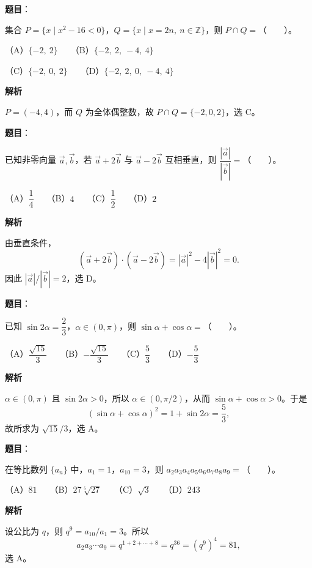 \begin{answer}

\textbf{题目}：

集合 $P=\{x\mid x^2-16<0\}$，$Q=\{x\mid x=2n,\ n\in\mathbb Z\}$，则 $P\cap Q=$\mbox{（　　）}。

（A）$\{-2,\ 2\}$　　（B）$\{-2,\ 2,\ -4,\ 4\}$

（C）$\{-2,\ 0,\ 2\}$　　（D）$\{-2,\ 2,\ 0,\ -4,\ 4\}$

\textbf{解析}

$P=(-4,4)$，而 $Q$ 为全体偶整数，故 $P\cap Q=\{-2,0,2\}$，选 C。


\end{answer}
\begin{answer}

\textbf{题目}：

已知非零向量 $\vec a,\vec b$，若 $\vec a+2\vec b$ 与 $\vec a-2\vec b$ 互相垂直，则 $\dfrac{|\vec a|}{|\vec b|}=$\mbox{（　　）}。

（A）$\dfrac14$　　（B）$4$　　（C）$\dfrac12$　　（D）$2$

\textbf{解析}

由垂直条件，
\nopagebreak[4]
\[
(\vec a+2\vec b)\cdot(\vec a-2\vec b)=|\vec a|^2-4|\vec b|^2=0.
\]
因此 $|\vec a|/|\vec b|=2$，选 D。


\end{answer}
\begin{answer}

\textbf{题目}：

已知 $\sin 2\alpha=\dfrac23$，$\alpha\in(0,\pi)$，则 $\sin\alpha+\cos\alpha=$\mbox{（　　）}。

（A）$\dfrac{\sqrt{15}}3$　　（B）$-\dfrac{\sqrt{15}}3$　　（C）$\dfrac53$　　（D）$-\dfrac53$

\textbf{解析}

$\alpha\in(0,\pi)$ 且 $\sin2\alpha>0$，所以 $\alpha\in(0,\pi/2)$，从而 $\sin\alpha+\cos\alpha>0$。于是
\nopagebreak[4]
\[
(\sin\alpha+\cos\alpha)^2=1+\sin2\alpha=\frac53,
\]
故所求为 $\sqrt{15}/3$，选 A。


\end{answer}
\begin{answer}

\textbf{题目}：

在等比数列 $\{a_n\}$ 中，$a_1=1$，$a_{10}=3$，则 $a_2a_3a_4a_5a_6a_7a_8a_9=$\mbox{（　　）}。

（A）$81$　　（B）$27\sqrt[5]{27}$　　（C）$\sqrt3$　　（D）$243$

\textbf{解析}

设公比为 $q$，则 $q^9=a_{10}/a_1=3$。所以
\nopagebreak[4]
\[
a_2a_3\cdots a_9=q^{1+2+\cdots+8}=q^{36}=(q^9)^4=81,
\]
选 A。


\end{answer}
